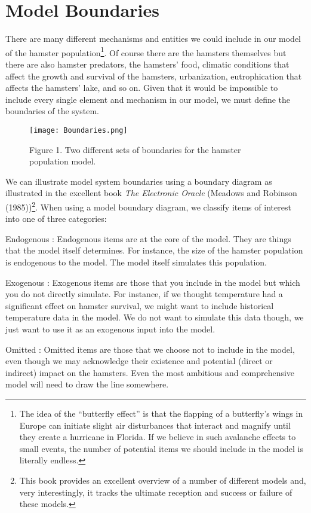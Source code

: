 \documentclass[]{memoir}
\let\Oldincludegraphics\includegraphics
\renewcommand{\includegraphics}[1]{\Oldincludegraphics[max size={\textwidth}{\textheight}]{#1}}
\begin{document}
\section{Model Boundaries}

There are many different mechanisms and entities we could include in our
model of the hamster population\footnote{The idea of the ``butterfly
  effect'' is that the flapping of a butterfly's wings in Europe can
  initiate slight air disturbances that interact and magnify until they
  create a hurricane in Florida. If we believe in such avalanche effects
  to small events, the number of potential items we should include in
  the model is literally endless.}. Of course there are the hamsters
themselves but there are also hamster predators, the hamsters' food,
climatic conditions that affect the growth and survival of the hamsters,
urbanization, eutrophication that affects the hamsters' lake, and so on.
Given that it would be impossible to include every single element and
mechanism in our model, we must define the boundaries of the system.

\begin{figure}[htbp]
\centering
\texttt{[image: Boundaries.png]}
\caption{Figure 1. Two different sets of boundaries for the hamster
population model.}
\end{figure}

We can illustrate model system boundaries using a boundary diagram as
illustrated in the excellent book \emph{The Electronic Oracle} (Meadows
and Robinson (1985))\footnote{This book provides an excellent overview
  of a number of different models and, very interestingly, it tracks the
  ultimate reception and success or failure of these models.}. When
using a model boundary diagram, we classify items of interest into one
of three categories:

Endogenous : Endogenous items are at the core of the model. They are
things that the model itself determines. For instance, the size of the
hamster population is endogenous to the model. The model itself
simulates this population.

Exogenous : Exogenous items are those that you include in the model but
which you do not directly simulate. For instance, if we thought
temperature had a significant effect on hamster survival, we might want
to include historical temperature data in the model. We do not want to
simulate this data though, we just want to use it as an exogenous input
into the model.

Omitted : Omitted items are those that we choose not to include in the
model, even though we may acknowledge their existence and potential
(direct or indirect) impact on the hamsters. Even the most ambitious and
comprehensive model will need to draw the line somewhere.
\end{document}
